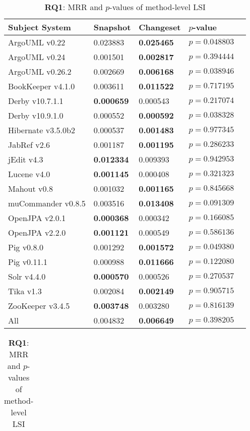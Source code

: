 \begin{table}[t]
\renewcommand{\arraystretch}{1.3}
\footnotesize
\centering
\caption{{\bf RQ1}: MRR and $p$-values of class-level LSI}
\begin{tabular}{l|ll|ll}
\toprule
Subject System & Snapshot & Changeset & $p$-value  \\
\midrule
ArgoUML v0.22 & 0.023883 & {\bf 0.025465 } & $p = 0.048803$ \\
ArgoUML v0.24 & 0.001501 & {\bf 0.002817 } & $p = 0.394444$ \\
ArgoUML v0.26.2 & 0.002669 & {\bf 0.006168 } & $p = 0.038946$ \\
BookKeeper v4.1.0 & 0.003611 & {\bf 0.011522 } & $p = 0.717195$ \\
Derby v10.7.1.1 & {\bf 0.000659 } & 0.000543 & $p = 0.217074$ \\
Derby v10.9.1.0 & 0.000552 & {\bf 0.000592 } & $p = 0.038328$ \\
Hibernate v3.5.0b2 & 0.000537 & {\bf 0.001483 } & $p = 0.977345$ \\
JabRef v2.6 & 0.001187 & {\bf 0.001195 } & $p = 0.286233$ \\
jEdit v4.3 & {\bf 0.012334 } & 0.009393 & $p = 0.942953$ \\
Lucene v4.0 & {\bf 0.001145 } & 0.000408 & $p = 0.321323$ \\
Mahout v0.8 & 0.001032 & {\bf 0.001165 } & $p = 0.845668$ \\
muCommander v0.8.5 & 0.003516 & {\bf 0.013408 } & $p = 0.091309$ \\
OpenJPA v2.0.1 & {\bf 0.000368 } & 0.000342 & $p = 0.166085$ \\
OpenJPA v2.2.0 & {\bf 0.001121 } & 0.000549 & $p = 0.586136$ \\
Pig v0.8.0 & 0.001292 & {\bf 0.001572 } & $p = 0.049380$ \\
Pig v0.11.1 & 0.000988 & {\bf 0.011666 } & $p = 0.122080$ \\
Solr v4.4.0 & {\bf 0.000570 } & 0.000526 & $p = 0.270537$ \\
Tika v1.3 & 0.002084 & {\bf 0.002149 } & $p = 0.905715$ \\
ZooKeeper v3.4.5 & {\bf 0.003748 } & 0.003280 & $p = 0.816139$ \\
\midrule
All & 0.004832 & {\bf 0.006649 } & $p = 0.398205$ \\
\bottomrule
\end{tabular}
\label{table:rq1:class:lsi}
\caption{{\bf RQ1}: MRR and $p$-values of method-level LSI}
\begin{tabular}{l|ll|ll}

\end{tabular}
\end{table}
